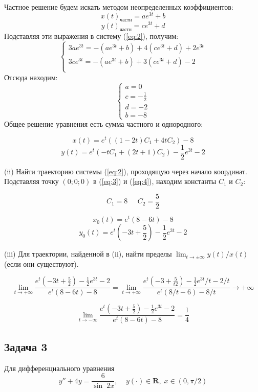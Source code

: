 \documentclass[a4paper, 12pt]{article}
\begin{document}
Частное решение будем искать методом неопределенных коэффициентов:
\[x(t)_{\text{частн}}=ae^{3t}+b\]
\[y(t)_{\text{частн}}=ce^{3t}+d\]
Подставляя эти выражения в систему (\ref{eq:2}), получим:
\[
\left\{
\begin{array}{lr}
3ae^{3t}=-(ae^{3t}+b)+4(ce^{3t}+d)+2e^{3t}\\
3ce^{3t}=-(ae^{3t}+b)+3(ce^{3t}+d)-2\\
\end{array}
\right.
\]
Отсюда находим:
\[
\left\{
\begin{array}{lr}
a = 0\\
c = - \frac 1 2 \\
d = -2 \\
b=-8
\end{array}
\right.
\]
Общее решение уравнения есть сумма частного и однородного:

\begin{equation}
x(t) = e^t\left(\left(1-2t\right)C_1+4tC_2\right)-8
\label{eq:3}
\end{equation}
\begin{equation}
y(t) = e^t\left(-tC_1+\left(2t+1\right)C_2\right)-\frac 1 2 e^{3t}-2
\label{eq:4}
\end{equation}

(ii) Найти траекторию системы (\ref{eq:2}), проходящую через начало координат.\\
Подставляя точку $(0;0;0)$ в (\ref{eq:3}) и (\ref{eq:4}), находим константы $C_1$ и $C_2$:

\[C_1 =8\;\;\;\;\; C_2 = \frac 5 2\]

\[
x_0(t) = e^t\left(8-6t\right)-8\]\[
y_0(t) = e^t\left(-3t+\frac 5 2\right)- \frac 1 2 e^{3t} - 2
\]

(iii) Для траектории, найденной в (ii), найти пределы $\lim_{t\rightarrow\pm\infty}y(t)/x(t)$ (если они существуют).


\[\lim_{t\rightarrow+\infty}\frac{e^t\left(-3t+\frac 5 2\right)- \frac 1 2 e^{3t} - 2}{ e^t\left(8-6t\right)-8}=\lim_{t\rightarrow+\infty}\frac{e^t\left(-3+\frac 5 {t2}\right)- \frac 1 2 e^{3t}/t - 2/t}{ e^t\left(8/t-6\right)-8/t}\rightarrow+\infty\]

\[\lim_{t\rightarrow-\infty}\frac{e^t\left(-3t+\frac 5 2\right)- \frac 1 2 e^{3t} - 2}{ e^t\left(8-6t\right)-8}=\frac{1}{4}\]


	\subsection* {Задача 3}
Для дифференциального уравнения 
\begin{equation}
y''+4y=\frac{6}{\sin\;2x}, \;\;\;\; y(\cdot)\in \textbf{R},\; x\in (0, \pi/2)
\label{eq:5}
\end{equation}
\end{document}
